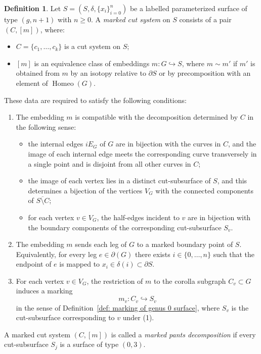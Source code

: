 \documentclass{amsart}
\newcommand{\Homeo}{\operatorname{Homeo}}
\theoremstyle{definition}
\newtheorem{definition}[theorem]{Definition}%
\numberwithin{equation}{section}
\begin{document}
\begin{definition}\label{def: marked cut system}\cite[Definition~3.3]{bk_marked_surfaces}
Let $S=(S,\delta,\{x_i\}_{i=0}^n)$ be a labelled parameterized surface of type $(g,n+1)$ with $n\geq 0$. A \emph{marked cut system} on $S$ consists of a pair $(C,[m])$, where:
\begin{itemize}
    \item $C=\{c_1,\ldots,c_k\}$ is a cut system on $S$;

    \item $[m]$ is an equivalence class of embeddings $m:G\hookrightarrow S$, where $m\sim m'$ if $m'$ is obtained from $m$ by an isotopy relative to $\partial S$ or by precomposition with an element of $\Homeo(G)$.
\end{itemize}

These data are required to satisfy the following conditions:
\begin{enumerate}
    \item The embedding $m$ is compatible with the decomposition determined by
    $C$ in the following sense:
    \begin{itemize}
        \item the internal edges $iE_G$ of $G$ are in bijection with the curves in $C$, and the image of each internal edge meets the corresponding curve transversely in a single point and is disjoint from all other curves in $C$;
        
        \item the image of each vertex lies in a distinct cut-subsurface of $S$, and this determines a bijection of the vertices $V_G$ with the connected components of $\overline{S\setminus C}$;
        
        \item for each vertex $v\in V_G$, the half-edges incident to $v$ are in bijection with the boundary components of the corresponding cut-subsurface $S_v$.
    \end{itemize}

    \item The embedding $m$ sends each leg of $G$ to a marked boundary point of $S$. Equivalently, for every leg $e\in \partial(G)$ there exists $i\in\{0,\ldots,n\}$ such that the endpoint of $e$ is mapped to $x_i\in \delta(i)\subset \partial S$.

    \item For each vertex $v\in V_G$, the restriction of $m$ to the corolla subgraph $C_v\subset G$ induces a marking
    \[
    m_v:C_v\hookrightarrow S_v
    \]
    in the sense of Definition~\ref{def: marking of genus 0 surface}, where $S_v$ is the cut-subsurface corresponding to $v$ under (1).
\end{enumerate}

A marked cut system $(C,[m])$ is called a \emph{marked pants decomposition} if every cut-subsurface $S_j$ is a surface of type $(0,3)$.
\end{definition}
\end{document}
